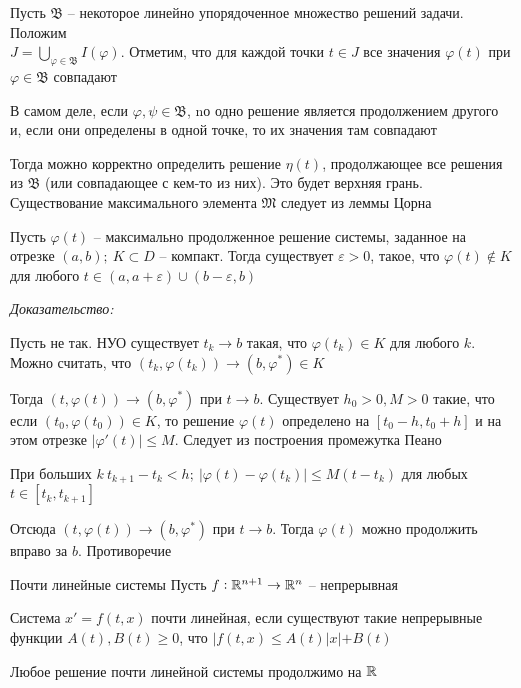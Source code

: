\documentclass[12pt]{article}
\begin{document}
Пусть $\mathfrak{B}$ -- некоторое линейно упорядоченное множество решений задачи. Положим \\ $J = \bigcup\limits_{\varphi \in \mathfrak{B}} I(\varphi)$. Отметим, что для каждой точки $t \in J$ все значения $\varphi(t)$ при $\varphi \in \mathfrak{B}$ совпадают

В самом деле, если $\varphi, \psi \in \mathfrak{B}$, nо одно решение является продолжением другого и, если они определены в одной точке, то их значения там совпадают 

Тогда можно корректно определить решение $\eta(t)$, продолжающее все решения из $\mathfrak{B}$ (или совпадающее с кем-то из них). Это будет верхняя грань. Существование максимального элемента $\mathfrak{M}$ следует из леммы Цорна 

\begin{theo}{}
    Пусть $\varphi(t)$ -- максимально продолженное решение системы, заданное на отрезке $(a, b);\ K \subset D$ -- компакт. Тогда существует $\varepsilon > 0$, такое, что $\varphi(t) \notin K$ для любого $t \in (a, a + \varepsilon) \cup (b - \varepsilon, b)$
\end{theo}

\textit{Доказательство:}

Пусть не так. НУО существует $t_k \to b$ такая, что $\varphi(t_k) \in K$ для любого $k$. Можно считать, что $(t_k, \varphi(t_k)) \to (b, \varphi^*) \in K$

Тогда $(t, \varphi(t)) \to (b, \varphi^*)$ при $t \to b$. Существует $h_0 > 0, M > 0$ такие, что если $(t_0, \varphi(t_0)) \in K$, то решение $\varphi(t)$ определено на $[t_0 - h, t_0 + h]$ и на этом отрезке $|\varphi'(t)| \leq M$. Следует из построения промежутка Пеано

При больших $k\ t_{k + 1} - t_k < h;\ |\varphi(t) - \varphi(t_k)| \leq M(t - t_k)$ для любых $t \in [t_k, t_{k + 1}]$

Отсюда $(t, \varphi(t)) \to (b, \varphi^*)$ при $t \to b$. Тогда $\varphi(t)$ можно продолжить вправо за $b$. Противоречие

\begin{defin}{Почти линейные системы}
    Пусть $f : \mathbb R^{n + 1} \to \mathbb R^n$ -- непрерывная

    Система $x' = f(t, x)$ почти линейная, если существуют такие непрерывные функции $A(t), B(t) \geq 0$, что $|f(t, x) \leq A(t)|x| + B(t)$
\end{defin}

\begin{theo}{}
    Любое решение почти линейной системы продолжимо на $\mathbb R$
\end{theo}
\end{document}

